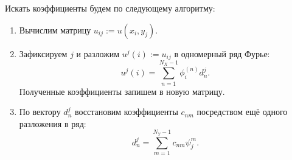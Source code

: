 \documentclass[14pt,a4paper]{extarticle}
\newcommand{\1}{\mathbbm{1}}
\begin{document}



Искать коэффициенты будем по следующему алгоритму:
\begin{enumerate}
    \item Вычислим матрицу $u_{ij}:= u(x_i, y_j)$.
    \item Зафиксируем $j$ и разложим $u^j(i) := u_{ij}$ в одномерный ряд Фурье:
          \begin{equation*}
              u^j(i) = \sum _{n = 1}^{N_X - 1} \phi_i^{(n)} d_n^j.
          \end{equation*}
          Полученные коэффициенты запишем в новую матрицу.
    \item По вектору $d_n^j$ восстановим коэффициенты $c_{nm}$ посредством ещё одного разложения в ряд:
          \begin{equation*}
              d_n^j = \sum _{m = 1}^{N_Y - 1} c_{nm} \psi_j^m.
          \end{equation*}
\end{enumerate}
\end{document}

